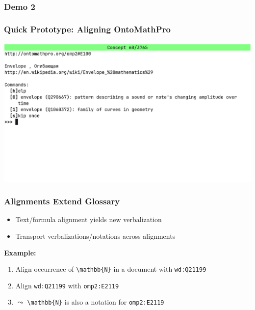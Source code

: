 \documentclass[aspectratio=169]{beamer}
\begin{document}
\begin{frame}
    \frametitle{Demo 2}
\end{frame}

\begin{frame}
    \frametitle{Quick Prototype: Aligning OntoMathPro}
    \centering
    \includegraphics[width=\textwidth]{screenshot.png}
\end{frame}

\begin{frame}[fragile]
    \frametitle{Alignments Extend Glossary}
    \begin{itemize}
        \item Text/formula alignment yields new verbalization
        \item Transport verbalizations/notations across alignments
    \end{itemize}
    \vspace{1em}\par
    \textbf{Example:}\\
    \begin{enumerate}
        \item Align occurrence of \verb|\mathbb{N}| in a document with \texttt{wd:Q21199}
        \item Align \texttt{wd:Q21199} with \texttt{omp2:E2119}
        \item $\leadsto$ \verb|\mathbb{N}| is also a notation for \texttt{omp2:E2119}
    \end{enumerate}
\end{frame}
\end{document}
